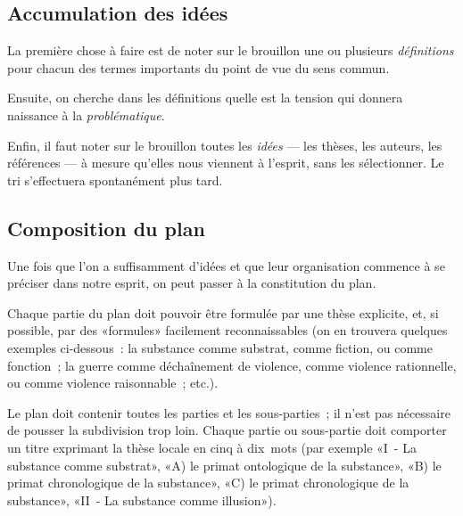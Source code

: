 \documentclass[a4paper,11pt]{article}
\begin{document}
\par

\subsection{Accumulation des idées}

La première chose à faire est de noter sur le brouillon une ou plusieurs
\emph{définitions} pour chacun des termes importants du point de vue du
sens commun.

\par

Ensuite, on cherche dans les définitions quelle est la tension qui
donnera naissance à la \emph{problématique}.

\par

Enfin, il faut noter sur le brouillon toutes les \emph{idées} --- les
thèses, les auteurs, les références --- à mesure qu'elles nous viennent
à l'esprit, sans les sélectionner. Le tri s'effectuera spontanément plus
tard.

\par

\subsection{Composition du plan}

Une fois que l'on a suffisamment d'idées et que leur organisation
commence à se préciser dans notre esprit, on peut passer à la
constitution du plan. 

\par

Chaque partie du plan doit pouvoir être formulée par une thèse
explicite, et, si possible, par des «formules» facilement
reconnaissables (on en trouvera quelques exemples ci-dessous~: la
substance comme substrat, comme fiction, ou comme fonction~; la guerre
comme déchaînement de violence, comme violence rationnelle, ou comme
violence raisonnable~; etc.).

\par

Le plan doit contenir toutes les parties et les sous-parties~; il n'est
pas nécessaire de pousser la subdivision trop loin. Chaque partie ou
sous-partie doit comporter un titre exprimant la thèse locale en cinq à
dix~mots (par exemple «I~- La substance comme substrat», «A) le primat
ontologique de la substance», «B) le primat
chronologique de la substance», «C) le primat
chronologique de la substance», «II~- La substance comme illusion»).
\end{document}
